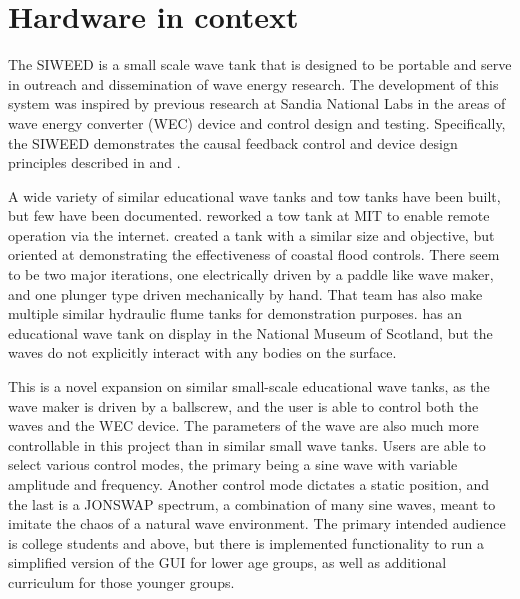 \documentclass[11pt, letterpaper]{article}
\begin{document}
\section{Hardware in context} %
The SIWEED is a small scale wave tank that is designed to be portable and serve in outreach and dissemination of wave energy research.
The development of this system was inspired by previous research at Sandia National Labs in the areas of wave energy converter (WEC) device and control design and testing.
Specifically, the SIWEED demonstrates the causal feedback control and device design principles described in \citet{Bacelli2020} and \citet{Coe2020a}.


A wide variety of similar educational wave tanks and tow tanks have been built, but few have been documented.
\citet{unger2006creating} reworked a tow tank at MIT to enable remote operation via the internet.
\citet{Trust2015} created a tank with a similar size and objective, but oriented at demonstrating the effectiveness of coastal flood controls.
There seem to be two major iterations, one electrically driven by a paddle like wave maker, and one plunger type driven mechanically by hand. 
That team has also make multiple similar hydraulic flume tanks for demonstration purposes.
\citet{Ivan2016} has an educational wave tank on display in the National Museum of Scotland, but the waves do not explicitly interact with any bodies on the surface. 

This is a novel expansion on similar small-scale educational wave tanks, as the wave maker is driven by a ballscrew, and the user is able to control both the waves and the WEC device.
The parameters of the wave are also much more controllable in this project than in similar small wave tanks.
Users are able to select various control modes, the primary being a sine wave with variable amplitude and frequency.
Another control mode dictates a static position, and the last is a JONSWAP spectrum, a combination of many sine waves, meant to imitate the chaos of a natural wave environment.
The primary intended audience is college students and above, but there is implemented functionality to run a simplified version of the GUI for lower age groups, as well as additional curriculum for those younger groups.
\end{document}
